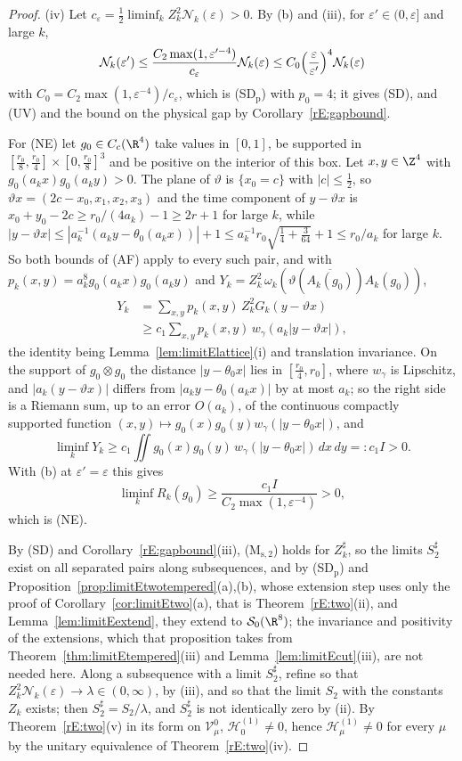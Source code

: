 \begin{proof}
(iv) Let $c_\varepsilon=\frac12\liminf_kZ_k^2\mathcal N_k(\varepsilon)>0$.
By (b) and (iii), for $\varepsilon'\in(0,\varepsilon]$ and large $k$,
\[
\mathcal N_k(\varepsilon')\le\frac{C_2\max(1,\varepsilon'^{-4})}{c_\varepsilon}
\mathcal N_k(\varepsilon)\le C_0\Bigl(\frac\varepsilon{\varepsilon'}\Bigr)^4
\mathcal N_k(\varepsilon)
\]
with $C_0=C_2\max(1,\varepsilon^{-4})/c_\varepsilon$, which is (SD$_{\mathrm p}$) with $p_0=4$; it gives (SD), and (UV) and the
bound on the physical gap by Corollary~\ref{rE:gapbound}.

For (NE) let $g_0\in C_c(\R^4)$ take values in $[0,1]$, be supported in
$[\frac{r_0}8,\frac{r_0}4]\times[0,\frac{r_0}8]^3$ and be positive on the
interior of this box. Let $x,y\in\Z^4$ with $g_0(a_kx)g_0(a_ky)>0$. The
plane of $\vartheta$ is $\{x_0=c\}$ with $|c|\le\frac12$, so $\vartheta x=
(2c-x_0,x_1,x_2,x_3)$ and the time component of $y-\vartheta x$ is
$x_0+y_0-2c\ge r_0/(4a_k)-1\ge2r+1$ for large $k$, while $|y-\vartheta x|\le
|a_k^{-1}(a_ky-\theta_0(a_kx))|+1\le a_k^{-1}r_0\sqrt{\tfrac14+\tfrac3{64}}
+1\le r_0/a_k$ for large $k$. So both bounds of (AF) apply to every such
pair, and with $p_k(x,y)=a_k^8g_0(a_kx)g_0(a_ky)$ and
$Y_k=Z_k^2\,\omega_k(\vartheta(\overline{A_k(g_0)})A_k(g_0))$,
\begin{align*}
Y_k&=\sum_{x,y}p_k(x,y)\,Z_k^2G_k(y-\vartheta x)\\
&\ge c_1\sum_{x,y}p_k(x,y)\,w_\gamma(a_k|y-\vartheta x|),
\end{align*}
the identity being Lemma~\ref{lem:limitElattice}(i) and translation
invariance. On the support of $g_0\otimes g_0$ the distance $|y-\theta_0x|$
lies in $[\frac{r_0}4,r_0]$, where $w_\gamma$ is Lipschitz, and
$|a_k(y-\vartheta x)|$ differs from $|a_ky-\theta_0(a_kx)|$ by at most
$a_k$; so the right side is a Riemann sum, up to an error $O(a_k)$, of the
continuous compactly supported function $(x,y)\mapsto g_0(x)g_0(y)w_\gamma(
|y-\theta_0x|)$, and
\[
\liminf_kY_k\ge c_1\iint g_0(x)g_0(y)\,w_\gamma(|y-\theta_0x|)\,dx\,dy=:c_1I>0 .
\]
With (b) at $\varepsilon'=\varepsilon$ this gives
\[
\liminf_kR_k(g_0)\ge\frac{c_1I}{C_2\max(1,\varepsilon^{-4})}>0 ,
\]
which is (NE).

By (SD) and Corollary~\ref{rE:gapbound}(iii), (M$_{\mathrm s,2}$) holds for
$Z^\sharp_k$, so the limits $S^\sharp_2$ exist on all separated pairs along
subsequences, and by (SD$_{\mathrm p}$) and
Proposition~\ref{prop:limitEtwotempered}(a),(b), whose extension step uses
only the proof of Corollary~\ref{cor:limitEtwo}(a), that is
Theorem~\ref{rE:two}(ii), and Lemma~\ref{lem:limitEextend}, they extend to
$\mathcal S_0(\R^8)$; the invariance and positivity of the extensions, which
that proposition takes from Theorem~\ref{thm:limitEtempered}(iii) and
Lemma~\ref{lem:limitEcut}(iii), are not needed here. Along a subsequence with a limit $S^\sharp_2$,
refine so that $Z_k^2\mathcal N_k(\varepsilon)\to\lambda\in(0,\infty)$, by
(iii), and so that the limit $S_2$ with the constants $Z_k$ exists; then
$S^\sharp_2=S_2/\lambda$, and $S^\sharp_2$ is not identically zero by (ii).
By Theorem~\ref{rE:two}(v) in its form on $\mathcal V^0_\mu$,
$\mathcal H^{(1)}_0\ne0$, hence $\mathcal H^{(1)}_\mu\ne0$ for every $\mu$
by the unitary equivalence of Theorem~\ref{rE:two}(iv).


\end{proof}
